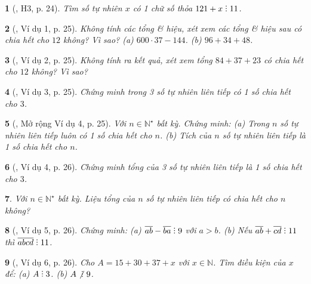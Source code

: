 \documentclass{article}
\newtheorem{baitoan}{}
\DeclareRobustCommand{\divby}{%
	\mathrel{\vbox{\baselineskip.65ex\lineskiplimit0pt\hbox{.}\hbox{.}\hbox{.}}}%
}
\begin{document}
\begin{baitoan}[\cite{Binh_boi_duong_Toan_6_tap_1}, H3, p. 24]
	Tìm số tự nhiên $x$ có 1 chữ số thỏa $121 + x\divby11$.
\end{baitoan}

\begin{baitoan}[\cite{Binh_boi_duong_Toan_6_tap_1}, Ví dụ 1, p. 25]
	Không tính các tổng \& hiệu, xét xem các tổng \& hiệu sau có chia hết cho $12$ không? Vì sao? (a) $600\cdot37 - 144$. (b) $96 + 34 + 48$.
\end{baitoan}

\begin{baitoan}[\cite{Binh_boi_duong_Toan_6_tap_1}, Ví dụ 2, p. 25]
	Không tính ra kết quả, xét xem tổng $84 + 37 + 23$ có chia hết cho $12$ không? Vì sao?
\end{baitoan}

\begin{baitoan}[\cite{Binh_boi_duong_Toan_6_tap_1}, Ví dụ 3, p. 25]
	Chứng minh trong 3 số tự nhiên liên tiếp có 1 số chia hết cho $3$.
\end{baitoan}

\begin{baitoan}[\cite{Binh_boi_duong_Toan_6_tap_1}, Mở rộng Ví dụ 4, p. 25]
	Với $n\in\mathbb{N}^\star$ bất kỳ. Chứng minh: (a) Trong $n$ số tự nhiên liên tiếp luôn có 1 số chia hết cho $n$. (b) Tích của $n$ số tự nhiên liên tiếp là 1 số chia hết cho $n$.
\end{baitoan}

\begin{baitoan}[\cite{Binh_boi_duong_Toan_6_tap_1}, Ví dụ 4, p. 26]
	Chứng minh tổng của 3 số tự nhiên liên tiếp là 1 số chia hết cho $3$.
\end{baitoan}

\begin{baitoan}
	Với $n\in\mathbb{N}^\star$ bất kỳ. Liệu tổng của $n$ số tự nhiên liên tiếp có chia hết cho $n$ không?
\end{baitoan}

\begin{baitoan}[\cite{Binh_boi_duong_Toan_6_tap_1}, Ví dụ 5, p. 26]
	Chứng minh: (a) $\overline{ab} - \overline{ba}\divby9$ với $a > b$. (b) Nếu $\overline{ab} + \overline{cd}\divby11$ thì $\overline{abcd}\divby11$.
\end{baitoan}

\begin{baitoan}[\cite{Binh_boi_duong_Toan_6_tap_1}, Ví dụ 6, p. 26]
	Cho $A = 15 + 30 + 37 + x$ với $x\in\mathbb{N}$. Tìm điều kiện của $x$ để: (a) $A\divby3$. (b) $A\not{\divby}\ 9$.
\end{baitoan}
\end{document}
